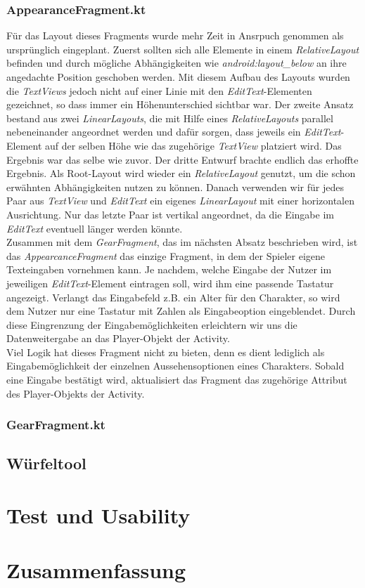 \newpage
\subsubsection{AppearanceFragment.kt}
Für das Layout dieses Fragments wurde mehr Zeit in Ansrpuch genommen als ursprünglich eingeplant. Zuerst sollten sich alle Elemente in einem \textit{RelativeLayout} befinden und durch mögliche Abhängigkeiten wie \textit{android:layout\_below} an ihre angedachte Position geschoben werden. Mit diesem Aufbau des Layouts wurden die \textit{TextViews} jedoch nicht auf einer Linie mit den \textit{EditText}-Elementen gezeichnet, so dass immer ein Höhenunterschied sichtbar war. Der zweite Ansatz bestand aus zwei \textit{LinearLayouts}, die mit Hilfe eines \textit{RelativeLayouts} parallel nebeneinander angeordnet werden und dafür sorgen, dass jeweils ein \textit{EditText}-Element auf der selben Höhe wie das zugehörige \textit{TextView} platziert wird. Das Ergebnis war das selbe wie zuvor. Der dritte Entwurf brachte endlich das erhoffte Ergebnis. Als Root-Layout wird wieder ein \textit{RelativeLayout} genutzt, um die schon erwähnten Abhängigkeiten nutzen zu können. Danach verwenden wir für jedes Paar aus \textit{TextView} und \textit{EditText} ein eigenes \textit{LinearLayout} mit einer horizontalen Ausrichtung. Nur das letzte Paar ist vertikal angeordnet, da die Eingabe im \textit{EditText} eventuell länger werden könnte.\\

Zusammen mit dem \textit{GearFragment}, das im nächsten Absatz beschrieben wird, ist das \textit{AppearcanceFragment} das einzige Fragment, in dem der Spieler eigene Texteingaben vornehmen kann. Je nachdem, welche Eingabe der Nutzer im jeweiligen \textit{EditText}-Element eintragen soll, wird ihm eine passende Tastatur angezeigt. Verlangt das Eingabefeld z.B. ein Alter für den Charakter, so wird dem Nutzer nur eine Tastatur mit Zahlen als Eingabeoption eingeblendet. Durch diese Eingrenzung der Eingabemöglichkeiten erleichtern wir uns die Datenweitergabe an das Player-Objekt der Activity.\\

Viel Logik hat dieses Fragment nicht zu bieten, denn es dient lediglich als Eingabemöglichkeit der einzelnen Aussehensoptionen eines Charakters. Sobald eine Eingabe bestätigt wird, aktualisiert das Fragment das zugehörige Attribut des Player-Objekts der Activity.

\subsubsection{GearFragment.kt}

\subsection{Würfeltool}


\section{Test und Usability}

\section{Zusammenfassung}
